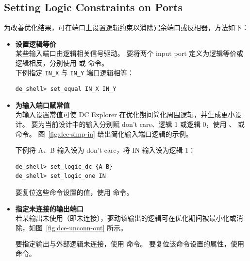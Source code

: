 \subsection*{Setting Logic Constraints on Ports}

为改善优化结果，可在端口上设置逻辑约束以消除冗余端口或反相器，方法如下：
\begin{itemize}
  \item \textbf{设置逻辑等价}\\
        某些输入端口由逻辑相关信号驱动。
要将两个 input port 定义为逻辑等价或逻辑相反，分别使用  或  命令。\\
        下例指定 \texttt{IN\_X} 与 \texttt{IN\_Y} 端口逻辑相等：
\begin{lstlisting}
de_shell> set_equal IN_X IN_Y
\end{lstlisting}

  \item \textbf{为输入端口赋常值}\\
        为输入设置常值可使 DC Explorer 在优化期间简化周围逻辑，并生成更小设计。
        要为当前设计中的输入分别赋 don't care、逻辑 1 或逻辑 0，使用 、 或  命令。
        图~\ref{fig:dce-simp-in} 给出简化输入端口逻辑的示例。


        下例将 A、B 输入设为 don't care，将 IN 输入设为逻辑 1：
\begin{lstlisting}
de_shell> set_logic_dc {A B}
de_shell> set_logic_one IN
\end{lstlisting}
        要复位这些命令设置的值，使用  命令。

  \item \textbf{指定未连接的输出端口}\\
        若某输出未使用（即未连接），驱动该输出的逻辑可在优化期间被最小化或消除，如图~\ref{fig:dce-unconn-out} 所示。


        要指定输出与外部逻辑未连接，使用  命令。
        要复位该命令设置的属性，使用  命令。
\end{itemize}

